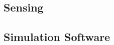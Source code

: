 \documentclass[final,12pt]{elsarticle}
\begin{document}
\subsection{Sensing}

\subsection{Simulation Software}

















\end{document}

